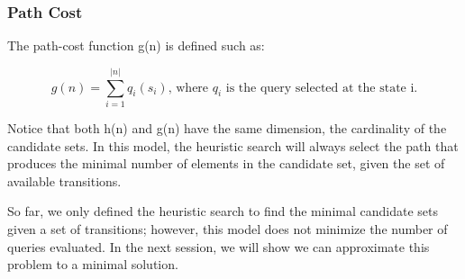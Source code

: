 \subsubsection{Path Cost} The path-cost function g(n) is defined such as:

\[
g(n) = \sum_{i=1}^{|n|} q_i(s_i) \text{, where $q_i$ is the query selected at the state i.}
\]
 
Notice that both h(n) and g(n) have the same dimension, the cardinality of the candidate sets. In this model, the heuristic search will always select the path that produces the minimal number of elements in the candidate set, given the set of available transitions.
   
So far, we only defined the heuristic search to find the minimal candidate sets given a set of transitions; however, this model does not minimize the number of queries evaluated. In the next session, we will show we can approximate this problem to a minimal solution.



 